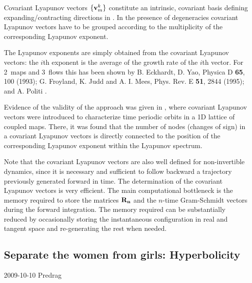 Covariant Lyapunov vectors $\{{\bf v}_{m}^k\}$ constitute an
intrinsic, covariant basis defining expanding/contracting
directions in \statesp.
In the presence of degeneracies covariant Lyapunov vectors
have to be grouped according to the multiplicity of the
corresponding Lyapunov exponent.

The Lyapunov exponents are simply obtained from the covariant
Lyapunov vectors: the $i$th exponent is the average of the
growth rate of the $i$th vector. For 2\dmn\ maps and 3\dmn\
flows this has been shown by
B. Eckhardt, D. Yao, Physica D {\bf 65}, 100 (1993);
G. Froyland, K. Judd and A. I. Mees, Phys. Rev. E {\bf 51}, 2844 (1995);
and
A. Politi \etal{}.

Evidence of the validity of the approach was given in
, where covariant Lyapunov vectors were
introduced to characterize time periodic orbits in a 1D
lattice of coupled maps. There, it was found that the number
of nodes (changes of sign) in a covariant Lyapunov vectors is
directly connected to the position of the corresponding
Lyapunov exponent within the Lyapunov spectrum.


Note that the covariant Lyapunov vectors are also well
defined for non-invertible dynamics, since it is necessary
and sufficient to follow backward a trajectory previously
generated forward in time. The determination of the covariant
Lyapunov vectors is very efficient. The main computational
bottleneck is the memory required to store the matrices ${\bf
R_n}$ and the $n$-time Gram-Schmidt vectors during the
forward integration. The memory required can be substantially
reduced by occasionally storing the instantaneous
configuration in real and tangent space and re-generating the
rest when needed.

\subsection{Separate the women from girls: Hyperbolicity}
\begin{description}
\item[2009-10-10 Predrag]
\end{description}

